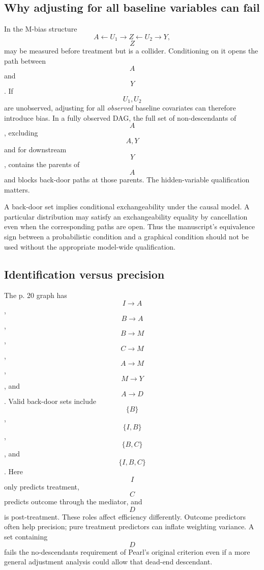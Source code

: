 \subsection{Why adjusting for all baseline variables can fail}
In the M-bias structure
\begin{equation}
A\leftarrow U_1\to Z\leftarrow U_2\to Y,
\end{equation}
$$Z$$ may be measured before treatment but is a collider. Conditioning on it opens the path between $$A$$ and $$Y$$. If $$U_1,U_2$$ are unobserved, adjusting for all \emph{observed} baseline covariates can therefore introduce bias. In a fully observed DAG, the full set of non-descendants of $$A$$, excluding $$A,Y$$ and for downstream $$Y$$, contains the parents of $$A$$ and blocks back-door paths at those parents. The hidden-variable qualification matters.
\begin{correction}
A back-door set implies conditional exchangeability under the causal model. A particular distribution may satisfy an exchangeability equality by cancellation even when the corresponding paths are open. Thus the manuscript's equivalence sign between a probabilistic condition and a graphical condition should not be used without the appropriate model-wide qualification.
\end{correction}

\subsection{Identification versus precision}
The p. 20 graph has $$I\to A$$, $$B\to A$$, $$B\to M$$, $$C\to M$$, $$A\to M$$, $$M\to Y$$, and $$A\to D$$. Valid back-door sets include $$\{B\}$$, $$\{I,B\}$$, $$\{B,C\}$$, and $$\{I,B,C\}$$. Here $$I$$ only predicts treatment, $$C$$ predicts outcome through the mediator, and $$D$$ is post-treatment. These roles affect efficiency differently. Outcome predictors often help precision; pure treatment predictors can inflate weighting variance. A set containing $$D$$ fails the no-descendants requirement of Pearl's original criterion even if a more general adjustment analysis could allow that dead-end descendant.

